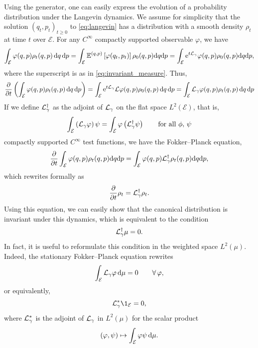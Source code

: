     Using the generator, one can easily express the evolution of a probability distribution under the Langevin dynamics.
    We assume for simplicity that the solution $(q_t,p_t)_{t\geq 0}$ to \eqref{eq:langevin} has a distribution with a smooth density $\rho_t$ at time $t$ over $\mathcal E$.
    For any $C^\infty$ compactly supported observable $\varphi$, we have
    $$\int_{\mathcal E}\varphi(q,p)\rho_t(q,p)\,\mathrm{d} q\,\mathrm{d} p=\int_{\mathcal E}\mathbb{E}^{(q,p)}\left[\varphi(q_t,p_t)\right]\rho_0(q,p)\mathrm{d} q\mathrm{d} p=\int_{\mathcal E}\mathrm{e}^{t\mathcal{L}_\gamma}\varphi(q,p)\rho_0(q,p)\mathrm{d} q\mathrm{d} p,$$
    where the superscript is as in \eqref{eq:invariant_measure}. Thus,
    $$\frac{\partial}{\partial t}\left(\int_{\mathcal E}\varphi(q,p)\rho_t(q,p)\,\mathrm{d} q\,\mathrm{d} p\right)=\int_{\mathcal E}\mathrm{e}^{t\mathcal{L}_\gamma}\mathcal{L}\varphi(q,p)\rho_0(q,p)\,\mathrm{d} q\,\mathrm{d} p=\int_{\mathcal E}\mathcal{L}_\gamma\varphi(q,p)\rho_t(q,p)\,\mathrm{d} q\,\mathrm{d} p$$
    If we define $\mathcal{L}_\gamma^\dagger$ as the adjoint of $\mathcal{L}_\gamma$ on the flat space $L^2(\mathcal E)$, that is,
    \begin{equation}
        \label{eq:L_dagger}
        \int_{\mathcal E}\left(\mathcal{L}_\gamma\varphi\right)\psi=\int_{\mathcal E}\varphi \left(\mathcal{L}_\gamma^\dagger \psi\right)\qquad\text{for all }\phi,\,\psi
    \end{equation}
     compactly supported $C^\infty$ test functions, we have the Fokker--Planck equation,
    \begin{equation}\label{eq:fokker_planck}
        \frac{\partial}{\partial t}\int_{\mathcal E}\varphi(q,p)\rho_t(q,p)\mathrm{d} q\mathrm{d} p=\int_{\mathcal E}\varphi(q,p)\mathcal{L}_\gamma^\dagger\rho_t(q,p)\mathrm{d} q \mathrm{d} p,
    \end{equation}
    which rewrites formally as 
    \begin{equation}
        \label{eq:fokker_planck_formal}
        \frac{\partial}{\partial t}\rho_t=\mathcal{L}_\gamma^\dagger\rho_t.
    \end{equation}
    Using this equation, we can easily show that the canonical distribution is invariant under this dynamics, which is equivalent to the condition 
    $$\mathcal{L}_\gamma^\dagger \mu=0.$$
    In fact, it is useful to reformulate this condition in the weighted space $L^{2}(\mu)$. Indeed, the stationary Fokker--Planck equation rewrites
    $$\int_{\mathcal E}\mathcal{L}_\gamma \varphi \,\mathrm{d} \mu=0\qquad \forall\,\varphi,$$
    or equivalently,
    $$\cL_\gamma^* \1_{\mathcal E}=0,$$
    where $\mathcal{L}_\gamma^*$ is the adjoint of $\mathcal{L}_\gamma$ in $L^2(\mu)$ for the scalar product
    $$(\varphi,\psi)\mapsto \int_{\mathcal E}\varphi \psi \,\mathrm{d} \mu.$$
